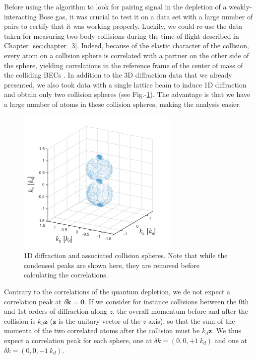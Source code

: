\label{sec:benchmark_algo}

Before using the algorithm to look for \kmk pairing signal in the depletion of a weakly-interacting Bose gas, it was crucial to test it on a data set with a large number of \kmk pairs to certify that it was working properly. Luckily, we could re-use the data taken for measuring two-body collisions during the time-of flight described in Chapter \ref{sec:chapter_3}. Indeed, because of the elastic character of the collision, every atom on a collision sphere is correlated with a partner on the other side of the sphere, yielding \kmk correlations in the reference frame of the center of mass of the colliding BECs \cite{hodgman2017solving,perrin2007observation}. In addition to the 3D diffraction data that we already presented, we also took data with a single lattice beam to induce 1D diffraction and obtain only two collision spheres (see Fig.-\ref{fig:1D_spheres}). The advantage is that we have a large number of atoms in these collision spheres, making the analysis easier. 

\begin{figure}
    \centering
    \includegraphics[width=0.7\textwidth]{Fig/Chapter4/1d_spheres.png}
    \caption[1D diffraction and associated collision spheres]{1D diffraction and associated collision spheres. Note that while the condensed peaks are shown here, they are removed before calculating the correlations.}
    \label{fig:1D_spheres}
\end{figure}

Contrary to the \kmk correlations of the quantum depletion, we de not expect a correlation peak at $\delta \bm{k}=\bm{0}$. If we consider for instance collisions between the 0th and 1st orders of diffraction along $z$, the overall momentum before and after the collision is $k_d \bm{z}$ ($\bm{z}$ is the unitary vector of the $z$ axis), so that the sum of the momenta of the two correlated atoms after the collision must be $k_d \bm{z}$. We thus expect a correlation peak for each sphere, one at $\delta k = (0,0,+1 \ k_d)$  and one at $\delta k = (0,0,-1 \ k_d)$.

